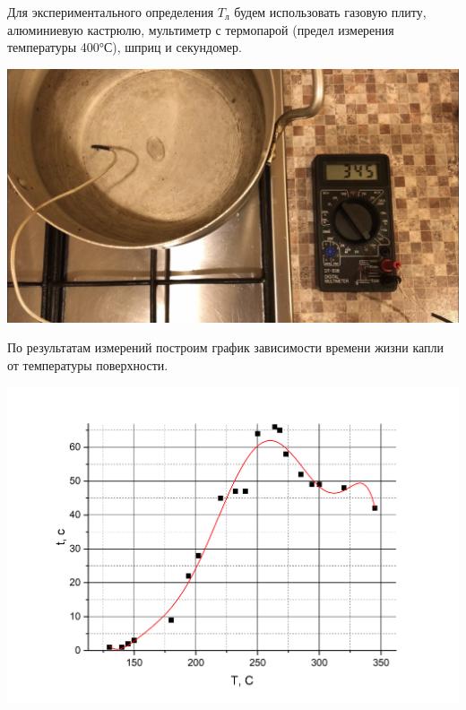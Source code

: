 \documentclass[a4paper,12pt]{article} %
\begin{document}
\noindent Для экспериментального определения $T_{\text{л}}$ будем использовать газовую плиту, алюминиевую кастрюлю, мультиметр с термопарой (предел измерения температуры 400°С), шприц и секундомер. 

\medskip
\begin{center}


  \includegraphics[scale={0.32}]{установка.png}


\end{center}

\medskip

\noindent По результатам измерений построим график зависимости времени жизни капли от температуры поверхности.



\begin{center}
  \includegraphics[scale={0.6}]{график.png}
\end{center}


\medskip
\end{document}
